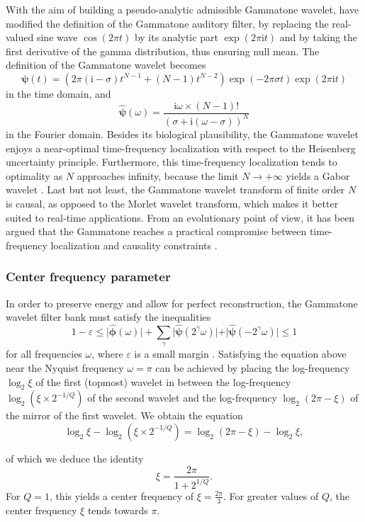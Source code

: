 \documentclass[smallextended]{svjour3}
\begin{document}
With the aim of building a pseudo-analytic admissible Gammatone wavelet,
\cite{Venkitaraman2014} have modified the definition of the Gammatone
auditory filter, by replacing the real-valued sine wave $\cos(2\pi t)$
by its analytic part $\exp(2\pi\mathrm{\mathrm{i}}t)$ and by taking
the first derivative of the gamma distribution, thus ensuring null
mean. The definition of the Gammatone wavelet becomes
\[
\boldsymbol{\psi}(t)=\left(2\pi(\mathrm{i}-\sigma)t^{N-1}+(N-1)t^{N-2}\right)\exp(-2\pi\sigma t)\exp(2\pi\mathrm{i}t)
\]
in the time domain, and
\[
\boldsymbol{\widehat{\psi}}(\omega)=\dfrac{\mathrm{i}\omega\times(N-1)!}{(\sigma+\mathrm{i}(\omega-\sigma))^{N}}
\]
in the Fourier domain. Besides its biological plausibility, the Gammatone
wavelet enjoys a near-optimal time-frequency localization with respect
to the Heisenberg uncertainty principle. Furthermore, this time-frequency
localization tends to optimality as $N$ approaches infinity, because
the limit $N\rightarrow+\infty$ yields a Gabor wavelet \cite{Cohen1995}.
Last but not least, the Gammatone wavelet transform of finite order
$N$ is causal, as opposed to the Morlet wavelet transform, which
makes it better suited to real-time applications. From an evolutionary
point of view, it has been argued that the Gammatone reaches a practical
compromise between time-frequency localization and causality constraints \cite{Venkitaraman2014}.


\subsubsection*{Center frequency parameter}

In order to preserve energy and allow for perfect reconstruction,
the Gammatone wavelet filter bank must satisfy the inequalities
\[
1-\varepsilon\leq\vert\boldsymbol{\hat{\phi}}(\omega)\vert+\sum_{\gamma}\vert\boldsymbol{\hat{\psi}}(2^{\gamma}\omega)\vert+\vert\boldsymbol{\hat{\psi}}(-2^{\gamma}\omega)\vert\leq1
\]
for all frequencies $\omega$, where $\varepsilon$ is a small margin
\cite{Anden2014}. Satisfying the equation above near the Nyquist
frequency $\omega=\pi$ can be achieved by placing the log-frequency
$\log_{2}\xi$ of the first (topmost) wavelet in between the log-frequency
$\log_{2}(\xi\times2^{-1/Q})$ of the second wavelet and the log-frequency
$\log_{2}(2\pi-\xi)$ of the mirror of the first wavelet. We obtain
the equation 
\[
\log_{2}\xi-\log_{2}(\xi\times2^{-1/Q})=\log_{2}(2\pi-\xi)-\log_{2}\xi,
\]

of which we deduce the identity
\[
\xi=\dfrac{2\pi}{1+2^{1/Q}}.
\]
For $Q=1$, this yields a center frequency of $\xi=\frac{2\pi}{3}$.
For greater values of $Q$, the center frequency $\xi$ tends towards
$\pi$.
\end{document}
